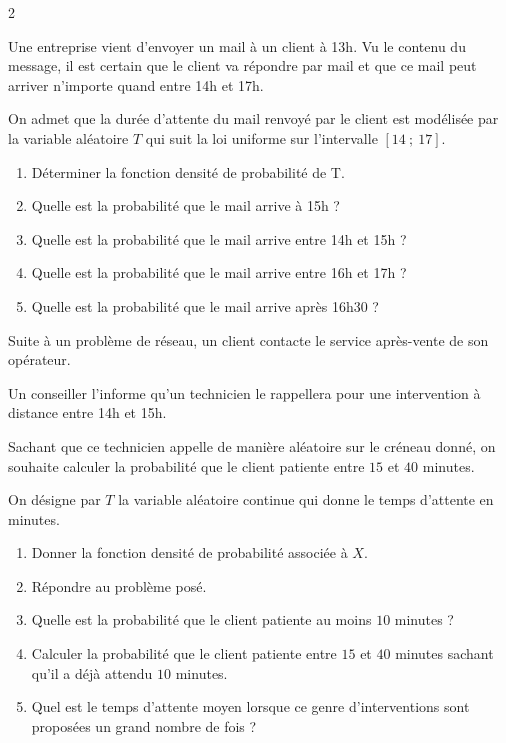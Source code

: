 \begin{multicols}{2}
	
\begin{exercice_cours}[\quad]{}


Une entreprise vient d'envoyer un mail à un client à 13h. Vu le contenu du message, il est certain que le client va répondre par mail et que ce mail peut arriver n'importe quand entre 14h et 17h.

On admet que la durée d'attente du mail renvoyé par le client est modélisée par la variable aléatoire $T$ qui suit la loi uniforme sur l'intervalle $[14~;~17]$.

\begin{enumerate}
	\item Déterminer la fonction densité de probabilité de T. 
	\item Quelle est la probabilité que le mail arrive à 15h ?
	\item Quelle est la probabilité que le mail arrive entre 14h et 15h ?
	\item Quelle est la probabilité que le mail arrive entre 16h et 17h ?
	\item Quelle est la probabilité que le mail arrive après 16h30 ?
\end{enumerate} 

		\end{exercice_cours}
\begin{exercice_cours}[\quad]{}

Suite à un problème de réseau, un client contacte le service après-vente de son opérateur.

Un conseiller l'informe qu'un technicien le rappellera pour une intervention à distance entre 14h et 15h.

Sachant que ce technicien appelle de manière aléatoire sur le créneau donné, on souhaite calculer la probabilité que le client patiente entre $15$ et $40$ minutes.


On désigne par $T$ la variable aléatoire continue qui donne le temps d’attente en minutes.

\begin{enumerate}
	\item Donner la fonction densité de probabilité associée à $X$.
	\item Répondre au problème posé.
	\item Quelle est la probabilité que le client patiente au moins $10$ minutes ?
	\item Calculer la probabilité que le client patiente entre $15$ et $40$ minutes sachant qu'il a déjà attendu $10$ minutes.
	\item Quel est le temps d'attente moyen lorsque ce genre d'interventions sont proposées un grand nombre de fois ?
\end{enumerate}

	\end{exercice_cours}

	

	\vfill
\end{multicols}

